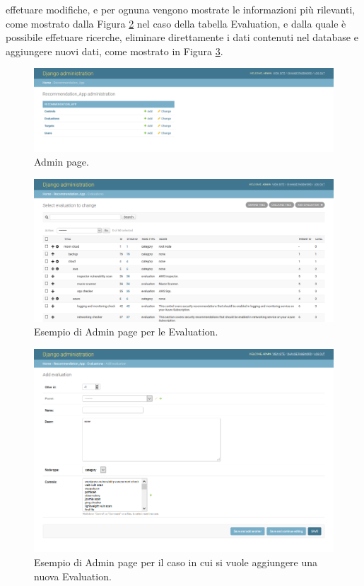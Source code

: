 effetuare modifiche, e per ognuna vengono mostrate le informazioni più rilevanti, come mostrato dalla 
Figura \ref{fig:MCRS_adminpage_evaluationEX} nel caso della tabella Evaluation, e dalla quale è possibile 
effetuare ricerche, eliminare direttamente i dati contenuti nel database e aggiungere 
nuovi dati, come mostrato in Figura \ref{fig:MCRS_adminpage_evaluationEX_add}.
%
\begin{figure}
    \includegraphics[scale=0.3]{images/MCRS_adminpage.png}
    \caption{Admin page.}
    \label{fig:MCRS_adminpage}
\end{figure}
%
\begin{figure}
    \includegraphics[scale=0.3]{images/MCRS_adminpage_evaluationEX.png}
    \caption{Esempio di Admin page per le Evaluation.}
    \label{fig:MCRS_adminpage_evaluationEX}
\end{figure}
%
\begin{figure}
    \includegraphics[scale=0.55]{images/MCRS_adminpage_evaluationEX_add.png}
    \caption{Esempio di Admin page per il caso in cui si vuole aggiungere una nuova Evaluation.}
    \label{fig:MCRS_adminpage_evaluationEX_add}
\end{figure}



